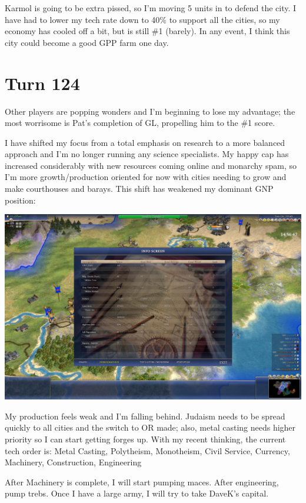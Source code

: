 \documentclass[10pt]{article}
\begin{document}
Karmol is going to be extra pissed, so I'm moving 5 units in to defend
the city. I have had to lower my tech rate down to 40\% to support all
the cities, so my economy has cooled off a bit, but is still \#1
(barely). In any event, I think this city could become a good GPP farm
one day.

\section*{Turn 124}

Other players are popping wonders and I'm beginning to lose my
advantage; the most worrisome is Pat's completion of GL, propelling
him to the \#1 score.

I have shifted my focus from a total emphasis on research to a more
balanced approach and I'm no longer running any science
specialists. My happy cap has increased considerably with new
resources coming online and monarchy spam, so I'm more
growth/production oriented for now with cities needing to grow and
make courthouses and barays. This shift has weakened my dominant GNP
position:

\includegraphics[width=1.0\textwidth]{turn124}

My production feels weak and I'm falling behind. Judaism needs to be
spread quickly to all cities and the switch to OR made; also, metal
casting needs higher priority so I can start getting forges up. With
my recent thinking, the current tech order is: Metal Casting,
Polytheism, Monotheism, Civil Service, Currency, Machinery,
Construction, Engineering

After Machinery is complete, I will start pumping maces. After
engineering, pump trebs. Once I have a large army, I will try to take
DaveK's capital.
\end{document}
